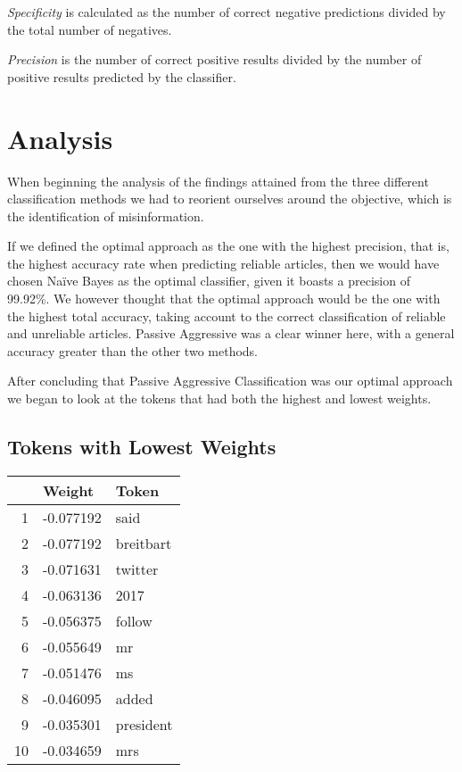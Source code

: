 \documentclass[12pt]{article}
\begin{document}
	\textit{Specificity} is calculated as the number of correct negative predictions divided by the total number of negatives.

	\textit{Precision} is the number of correct positive results divided by the number of positive results predicted by the classifier.

	\section{Analysis}

    When beginning the analysis of the findings attained from the three different classification methods we had to reorient ourselves around the objective, which is the identification of misinformation.

    If we defined the optimal approach as the one with the highest precision, that is, the highest accuracy rate when predicting reliable articles, then we would have chosen Naïve Bayes as the optimal classifier, given it boasts a precision of 99.92\%. We however thought that the optimal approach would be the one with the highest total accuracy, taking account to the correct classification of reliable and unreliable articles. Passive Aggressive was a clear winner here, with a general accuracy greater than the other two methods.

    After concluding that Passive Aggressive Classification was our optimal approach we began to look at the tokens that had both the highest and lowest weights.

    \subsection{Tokens with Lowest Weights}
	\begin{tabular}{r | l l}
		                & Weight & Token & \\
		\hline
		1   & -0.077192     & said          \\
		2   & -0.077192	    & breitbart     \\
		3   & -0.071631     & twitter       \\
		4   & -0.063136	    & 2017          \\
		5   & -0.056375	    & follow        \\
		6   & -0.055649	    & mr            \\
		7   & -0.051476	    & ms            \\
		8   & -0.046095	    & added         \\
		9   & -0.035301	    & president     \\
		10  & -0.034659     & mrs           \\
	\end{tabular}
\end{document}
